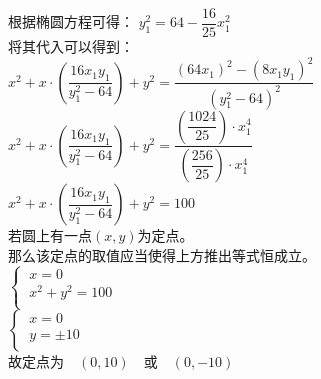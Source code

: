 \documentclass[UTF8]{ctexart}
\begin{document}
\begin{multicols}{2}
        根据椭圆方程可得：
        $y_1^2=64-\dfrac{16}{25}x_1^2$\\[5mm]
        将其代入可以得到：\\[4mm]
        $x^2+x\cdot\left(\dfrac{16x_1y_1}{y_1^2-64}\right)+y^2=\dfrac{(64x_1)^2-(8x_1y_1)^2}{\left(y_1^2-64\right)^2}$\\[5mm]
        $x^2+x\cdot\left(\dfrac{16x_1y_1}{y_1^2-64}\right)+y^2=\dfrac{\left(\dfrac{1024}{25}\right)\cdot x_1^4}{\left(\dfrac{256}{25}\right)\cdot x_1^4}$\\[5mm]
        $x^2+x\cdot\left(\dfrac{16x_1y_1}{y_1^2-64}\right)+y^2=100$\\[8mm]
        若圆上有一点$(x,y)$为定点。\\[3mm]
        那么该定点的取值应当使得上方推出等式恒成立。\\[5mm]
        \begin{math}
            \begin{cases}
                ~x=0\\[1mm]
                ~x^2+y^2=100\\[1mm]
            \end{cases}
        \end{math}\\[5mm]
        \begin{math}
            \begin{cases}
                ~x=0\\[1mm]
                ~y=\pm 10\\[1mm]
            \end{cases}
        \end{math}\\[5mm]
        故定点为~~$(0,10)$~~或~~$(0,-10)$
        \newpage
    \end{multicols}

\newpage
\end{document}
